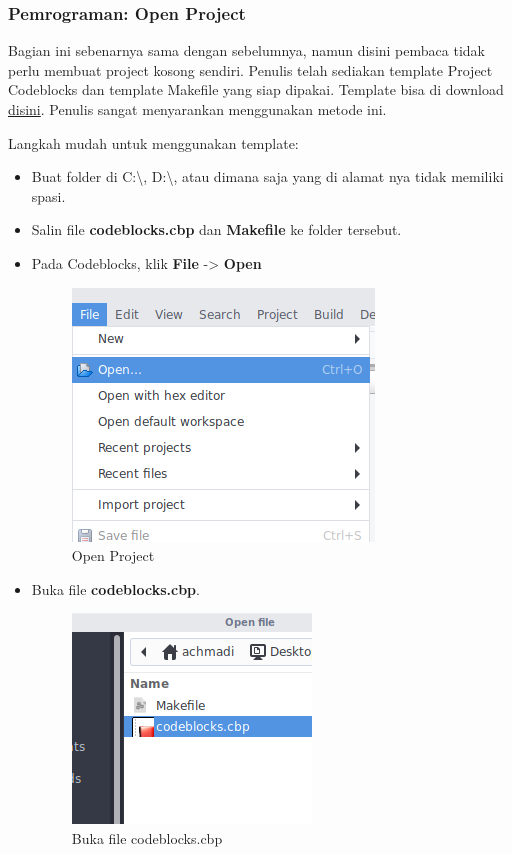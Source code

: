 \documentclass[12pt,]{article}
\begin{document}
	\newpage
	\subsubsection{Pemrograman: Open Project}

	Bagian ini sebenarnya sama dengan sebelumnya, namun disini pembaca tidak perlu membuat project kosong sendiri.
	Penulis telah sediakan template Project Codeblocks dan template Makefile yang siap dipakai.
	Template bisa di download \href{https://github.com/mekatronik-achmadi/atmega-demos/tree/master/template/codeblocks/}{disini}.
	Penulis sangat menyarankan menggunakan metode ini.

	Langkah mudah untuk menggunakan template:
	\begin{itemize}
		\item Buat folder di C:\textbackslash, D:\textbackslash, atau dimana saja yang di alamat nya tidak memiliki spasi.

		\item Salin file \textbf{codeblocks.cbp} dan \textbf{Makefile} ke folder tersebut.

		\item Pada Codeblocks, klik \textbf{File} -> \textbf{Open}

		\begin{figure}[H]
			\centering
			\includegraphics[width=0.5\linewidth]{images/cbp_0}
			\caption{Open Project}
		\end{figure}

		\item Buka file \textbf{codeblocks.cbp}.

		\begin{figure}[H]
			\centering
			\includegraphics[width=0.5\linewidth]{images/cbp_1}
			\caption{Buka file codeblocks.cbp}
		\end{figure}


\end{itemize}
\end{document}
